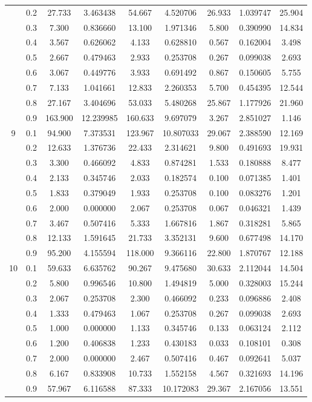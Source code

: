 \begin{longtable}{ | c | c || c | c | c | c | c | c | c | }
 & 0.2 & 27.733 & 3.463438 & 54.667 & 4.520706 & 26.933 & 1.039747 & 25.904 \\
 & 0.3 & 7.300 & 0.836660 & 13.100 & 1.971346 & 5.800 & 0.390990 & 14.834 \\
 & 0.4 & 3.567 & 0.626062 & 4.133 & 0.628810 & 0.567 & 0.162004 & 3.498 \\
 & 0.5 & 2.667 & 0.479463 & 2.933 & 0.253708 & 0.267 & 0.099038 & 2.693 \\
 & 0.6 & 3.067 & 0.449776 & 3.933 & 0.691492 & 0.867 & 0.150605 & 5.755 \\
 & 0.7 & 7.133 & 1.041661 & 12.833 & 2.260353 & 5.700 & 0.454395 & 12.544 \\
 & 0.8 & 27.167 & 3.404696 & 53.033 & 5.480268 & 25.867 & 1.177926 & 21.960 \\
 & 0.9 & 163.900 & 12.239985 & 160.633 & 9.697079 & 3.267 & 2.851027 & 1.146 \\
 \hline
\multirow{9}{*}{9} & 0.1 & 94.900 & 7.373531 & 123.967 & 10.807033 & 29.067 & 2.388590 & 12.169 \\
 & 0.2 & 12.633 & 1.376736 & 22.433 & 2.314621 & 9.800 & 0.491693 & 19.931 \\
 & 0.3 & 3.300 & 0.466092 & 4.833 & 0.874281 & 1.533 & 0.180888 & 8.477 \\
 & 0.4 & 2.133 & 0.345746 & 2.033 & 0.182574 & 0.100 & 0.071385 & 1.401 \\
 & 0.5 & 1.833 & 0.379049 & 1.933 & 0.253708 & 0.100 & 0.083276 & 1.201 \\
 & 0.6 & 2.000 & 0.000000 & 2.067 & 0.253708 & 0.067 & 0.046321 & 1.439 \\
 & 0.7 & 3.467 & 0.507416 & 5.333 & 1.667816 & 1.867 & 0.318281 & 5.865 \\
 & 0.8 & 12.133 & 1.591645 & 21.733 & 3.352131 & 9.600 & 0.677498 & 14.170 \\
 & 0.9 & 95.200 & 4.155594 & 118.000 & 9.366116 & 22.800 & 1.870767 & 12.188 \\
 \hline
\multirow{9}{*}{10} & 0.1 & 59.633 & 6.635762 & 90.267 & 9.475680 & 30.633 & 2.112044 & 14.504 \\
 & 0.2 & 5.800 & 0.996546 & 10.800 & 1.494819 & 5.000 & 0.328003 & 15.244 \\
 & 0.3 & 2.067 & 0.253708 & 2.300 & 0.466092 & 0.233 & 0.096886 & 2.408 \\
 & 0.4 & 1.333 & 0.479463 & 1.067 & 0.253708 & 0.267 & 0.099038 & 2.693 \\
 & 0.5 & 1.000 & 0.000000 & 1.133 & 0.345746 & 0.133 & 0.063124 & 2.112 \\
 & 0.6 & 1.200 & 0.406838 & 1.233 & 0.430183 & 0.033 & 0.108101 & 0.308 \\
 & 0.7 & 2.000 & 0.000000 & 2.467 & 0.507416 & 0.467 & 0.092641 & 5.037 \\
 & 0.8 & 6.167 & 0.833908 & 10.733 & 1.552158 & 4.567 & 0.321693 & 14.196 \\
 & 0.9 & 57.967 & 6.116588 & 87.333 & 10.172083 & 29.367 & 2.167056 & 13.551 \\
 \hline
\hline
\end{longtable}
 
